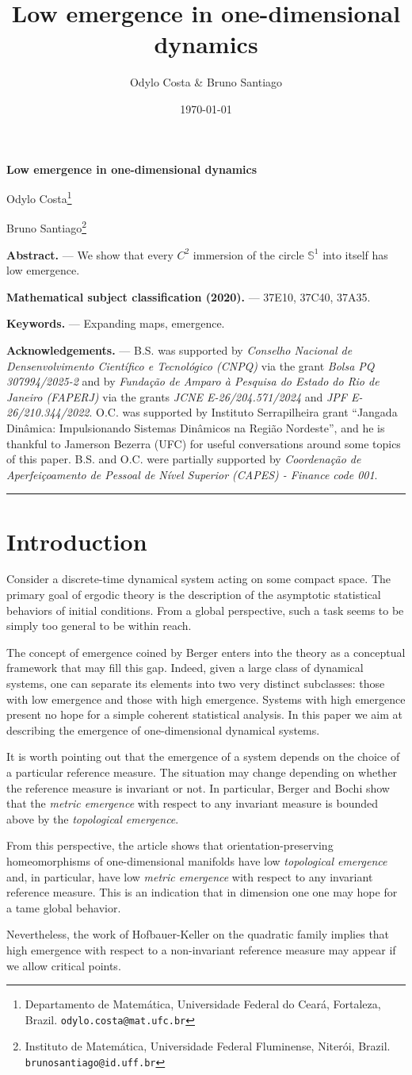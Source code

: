 \documentclass[12pt,a4paper,twoside]{article}
\makeatletter
\theoremstyle{plain}
\theoremstyle{definition}
\renewcommand{\maketitle}{

\thispagestyle{empty}

\begin{center}



{\Large\bfseries
Low emergence in one-dimensional dynamics
\par}

\vspace{1cm}

{%
\large
Odylo Costa\footnote{%
Departamento de Matemática, Universidade Federal do Ceará,
Fortaleza, Brazil. \texttt{odylo.costa@mat.ufc.br}}

Bruno Santiago\footnote{%
Instituto de Matemática, Universidade Federal Fluminense,
Niterói, Brazil. \texttt{brunosantiago@id.uff.br}}
\par
}

\end{center}

\vspace{1cm}

\noindent\textbf{Abstract.} ---
We show that every $C^2$ immersion of the circle $\mathbb{S}^1$ into itself has low emergence.      
\vspace{0.4cm}


\tableofcontents

\vspace{0.6cm}

\noindent\textbf{Mathematical subject classification (2020).} --- 37E10, 37C40, 37A35.

\smallskip

\noindent\textbf{Keywords.} --- Expanding maps, emergence.

\smallskip

\noindent\textbf{Acknowledgements.} --- B.S. was supported by \emph{Conselho Nacional de Densenvolvimento Científico e Tecnológico (CNPQ)} via the grant \emph{Bolsa PQ 307994/2025-2} and by \emph{Fundação de Amparo à Pesquisa do Estado do Rio de Janeiro (FAPERJ)} via the grants \emph{JCNE E-26/204.571/2024} and \emph{JPF E-26/210.344/2022}. O.C. was supported by Instituto Serrapilheira grant “Jangada Dinâmica: Impulsionando Sistemas Dinâmicos na Região Nordeste”, and he is thankful to Jamerson Bezerra (UFC) for useful conversations around some topics of this paper. B.S. and O.C. were partially supported by \emph{Coordenação de Aperfeiçoamento de Pessoal de Nível Superior (CAPES) - Finance code 001}.

\vspace{0.5cm}

\hrule

\vspace{0.3cm}



\newpage

}
\makeatother
\begin{document}
\title{Low emergence in one-dimensional dynamics}
\author{Odylo Costa \& Bruno Santiago}
\date{\today}

\maketitle

\section{Introduction}

Consider a discrete-time dynamical system acting on some compact space. The primary goal of ergodic theory is the description of the asymptotic statistical behaviors of initial conditions. From a global perspective, such a task seems to be simply too general to be within reach. 

The concept of emergence coined by Berger \cite{Berger2017} enters into the theory as a conceptual framework that may fill this gap. Indeed, given a large class of dynamical systems, one can separate its elements into two very distinct subclasses: those with low emergence and those with high emergence. Systems with high emergence present no hope for a simple coherent statistical analysis. In this paper we aim at describing the emergence of one-dimensional dynamical systems.

It is worth pointing out that the emergence of a system depends on the choice of a particular reference measure. The situation may change depending on whether the reference measure is invariant or not. In particular, Berger and Bochi \cite{BergerBochiAIM2021} show that the \emph{metric emergence} with respect to any invariant measure is bounded above by the \emph{topological emergence}.

From this perspective, the article \cite{CarvalhoRodriguesVarandas2024Emergence} shows that orientation-preserving homeomorphisms of one-dimensional manifolds have low \emph{topological emergence} and, in particular, have low \emph{metric emergence} with respect to any invariant reference measure. This is an indication that in dimension one one may hope for a tame global behavior.

Nevertheless, the work of Hofbauer-Keller \cite{HofbauerKeller1995MaxOsc} on the quadratic family implies that high emergence with respect to a non-invariant reference measure may appear if we allow critical points.
\end{document}
